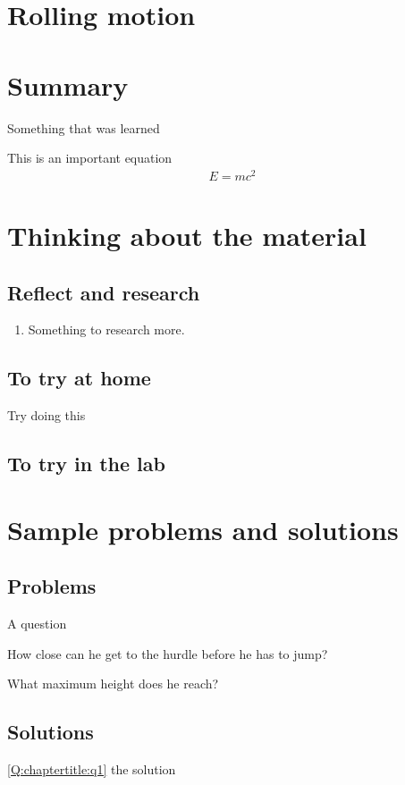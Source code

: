 \section{Rolling motion}

\newpage
\section{Summary}

\begin{chapterSummary}{
\item Something that was learned
}
\end{chapterSummary}

\newpage
\begin{importantEquations}
This is an important equation
\begin{align*}
E = mc^2
\end{align*}

\end{importantEquations}


\newpage
\section{Thinking about the material}
\subsection{Reflect and research}

\begin{enumerate}
\item Something to research more.
\end{enumerate}
\subsection{To try at home}

\begin{tQuestion}Try doing this \end{tQuestion}

\subsection{To try in the lab}

\newpage
\section{Sample problems and solutions}
\subsection{Problems}
\begin{problemParts}{A question\label{Q:chaptertitle:q1}}
\item How close can he get to the hurdle before he has to jump?
\item What maximum height does he reach?
\end{problemParts}

\newpage
\subsection{Solutions}
\begin{solution}{\ref{Q:chaptertitle:q1}}
{
the solution
}
\end{solution}

